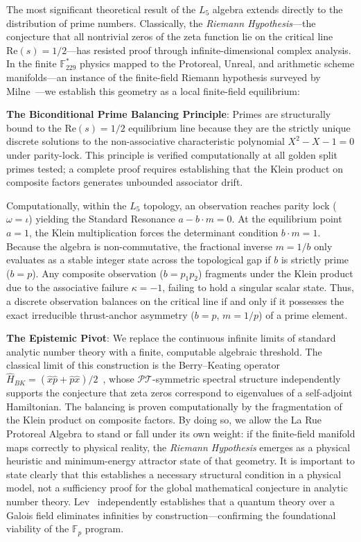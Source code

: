 \documentclass[12pt,oneside]{article}
\theoremstyle{principia}
\theoremstyle{definition}
\theoremstyle{remark}
\providecommand{\kap}{\kappa}
\begin{document}
The most significant theoretical result of the $L_5$ algebra extends directly to the distribution of prime numbers. Classically, the \emph{Riemann Hypothesis}---the conjecture that all nontrivial zeros of the zeta function lie on the critical line $\text{Re}(s) = 1/2$---has resisted proof through infinite-dimensional complex analysis. In the finite $\mathbb{F}_{229}^*$ physics mapped to the Protoreal, Unreal, and arithmetic scheme manifolds---an instance of the finite-field Riemann hypothesis surveyed by Milne~\cite{milne-rhff}---we establish this geometry as a local finite-field equilibrium:

\textbf{The Biconditional Prime Balancing Principle}: Primes are structurally bound to the $\text{Re}(s) = 1/2$ equilibrium line because they are the strictly unique discrete solutions to the non-associative characteristic polynomial $X^2 - X - 1 = 0$ under parity-lock. This principle is verified computationally at all golden split primes tested; a complete proof requires establishing that the Klein product on composite factors generates unbounded associator drift.

Computationally, within the $L_5$ topology, an observation reaches parity lock ($\omega = \iota$) yielding the Standard Resonance $a - b \cdot m = 0$. At the equilibrium point $a = 1$, the Klein multiplication forces the determinant condition $b \cdot m = 1$. Because the algebra is non-commutative, the fractional inverse $m = 1/b$ only evaluates as a stable integer state across the topological gap if $b$ is strictly prime ($b=p$). Any composite observation ($b = p_1 p_2$) fragments under the Klein product due to the associative failure $\kap = -1$, failing to hold a singular scalar state. Thus, a discrete observation balances on the critical line if and only if it possesses the exact irreducible thrust-anchor asymmetry ($b = p$, $m = 1/p$) of a prime element.

\textbf{The Epistemic Pivot}: We replace the continuous infinite limits of standard analytic number theory with a finite, computable algebraic threshold. The classical limit of this construction is the Berry--Keating operator $\hat{H}_{BK} = (\hat{x}\hat{p} + \hat{p}\hat{x})/2$~\cite{bender-brody-muller}, whose $\mathcal{PT}$-symmetric spectral structure independently supports the conjecture that zeta zeros correspond to eigenvalues of a self-adjoint Hamiltonian. The balancing is proven computationally by the fragmentation of the Klein product on composite factors. By doing so, we allow the La Rue Protoreal Algebra to stand or fall under its own weight: if the finite-field manifold maps correctly to physical reality, the \emph{Riemann Hypothesis} emerges as a physical heuristic and minimum-energy attractor state of that geometry. It is important to state clearly that this establishes a necessary structural condition in a physical model, not a sufficiency proof for the global mathematical conjecture in analytic number theory. Lev~\cite{lev-gfqt, lev-finite-math} independently establishes that a quantum theory over a Galois field eliminates infinities by construction---confirming the foundational viability of the $\mathbb{F}_p$ program.
\end{document}

